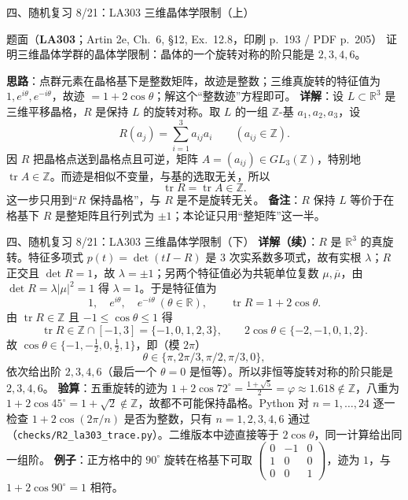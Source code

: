 \documentclass[aspectratio=169,10pt,fontset=none]{ctexbeamer}
\newcommand{\ex}[1]{\textcolor{accent}{\footnotesize\bfseries #1}}
\newcommand{\key}[1]{\textcolor{ink}{\bfseries #1}}
\begin{document}
\begin{frame}[t]{四、随机复习 8/21：LA303 三维晶体学限制（上）}
\label{ex:LA303}
\scriptsize
\begin{block}{\footnotesize 题面（\ex{LA303}；Artin 2e, Ch.~6, §12, Ex.~12.8，印刷 p.~193 / PDF p.~205）}
证明三维晶体学群的晶体学限制：晶体的一个旋转对称的阶只能是 $2,3,4,6$。
\end{block}
\key{思路}：点群元素在晶格基下是整数矩阵，故迹是整数；三维真旋转的特征值为 $1,e^{i\theta},e^{-i\theta}$，故迹 $=1+2\cos\theta$；解这个“整数迹”方程即可。
\key{详解}：设 $L\subset\mathbb R^3$ 是三维平移晶格，$R$ 是保持 $L$ 的旋转对称。取 $L$ 的一组 $\mathbb Z$-基 $a_1,a_2,a_3$，设
\[ R(a_j)=\sum_{i=1}^{3}a_{ij}a_i\qquad (a_{ij}\in\mathbb Z). \]
因 $R$ 把晶格点送到晶格点且可逆，矩阵 $A=(a_{ij})\in GL_3(\mathbb Z)$，特别地 $\operatorname{tr}A\in\mathbb Z$。而迹是相似不变量，与基的选取无关，所以
\[ \operatorname{tr}R=\operatorname{tr}A\in\mathbb Z. \]
这一步只用到“$R$ 保持晶格”，与 $R$ 是不是旋转无关。
\key{备注}：$R$ 保持 $L$ 等价于在格基下 $R$ 是整矩阵且行列式为 $\pm1$；本论证只用“整矩阵”这一半。
\end{frame}

\begin{frame}[t]{四、随机复习 8/21：LA303 三维晶体学限制（下）}
\scriptsize
\key{详解（续）}：$R$ 是 $\mathbb R^3$ 的真旋转。特征多项式 $p(t)=\det(tI-R)$ 是 3 次实系数多项式，故有实根 $\lambda$；$R$ 正交且 $\det R=1$，故 $\lambda=\pm1$；另两个特征值必为共轭单位复数 $\mu,\overline\mu$，由 $\det R=\lambda|\mu|^2=1$ 得 $\lambda=1$。于是特征值为
\[ 1,\quad e^{i\theta},\quad e^{-i\theta}\ (\theta\in\mathbb R),\qquad \operatorname{tr}R=1+2\cos\theta. \]
由 $\operatorname{tr}R\in\mathbb Z$ 且 $-1\le\cos\theta\le1$ 得
\[ \operatorname{tr}R\in\mathbb Z\cap[-1,3]=\{-1,0,1,2,3\},\qquad 2\cos\theta\in\{-2,-1,0,1,2\}. \]
故 $\cos\theta\in\{-1,-\tfrac12,0,\tfrac12,1\}$，即（模 $2\pi$）
\[ \theta\in\{\pi,2\pi/3,\pi/2,\pi/3,0\}, \]
依次给出阶 $2,3,4,6$（最后一个 $\theta=0$ 是恒等）。所以非恒等旋转对称的阶只能是 $2,3,4,6$。
\key{验算}：五重旋转的迹为 $1+2\cos72^\circ=\tfrac{1+\sqrt5}{2}=\varphi\approx1.618\notin\mathbb Z$，八重为 $1+2\cos45^\circ=1+\sqrt2\notin\mathbb Z$，故都不可能保持晶格。Python 对 $n=1,\dots,24$ 逐一检查 $1+2\cos(2\pi/n)$ 是否为整数，只有 $n=1,2,3,4,6$ 通过（\texttt{checks/R2\_la303\_trace.py}）。二维版本中迹直接等于 $2\cos\theta$，同一计算给出同一组阶。
\key{例子}：正方格中的 $90^\circ$ 旋转在格基下可取 $\begin{pmatrix}0&-1&0\\1&0&0\\0&0&1\end{pmatrix}$，迹为 $1$，与 $1+2\cos90^\circ=1$ 相符。
\end{frame}
\end{document}
